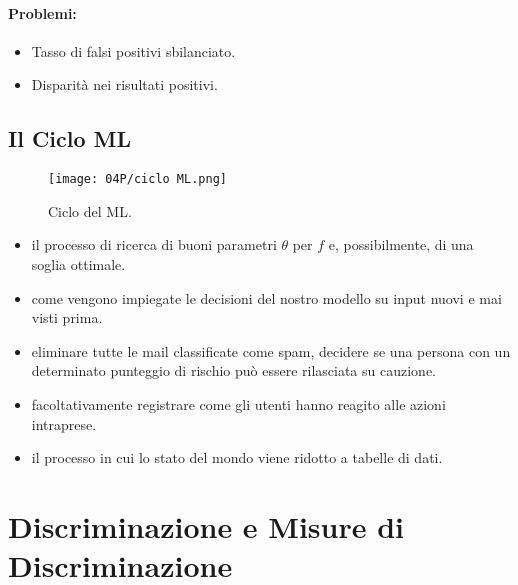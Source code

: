 

\paragraph{Problemi:}

\begin{itemize}
  \item Tasso di falsi positivi sbilanciato. 
  \item Disparità nei risultati positivi.
\end{itemize}

\subsection{Il Ciclo ML}


\begin{figure}[h]
    \centering
    \texttt{[image: 04P/ciclo ML.png]}
    \caption{Ciclo del ML.}
\end{figure}

\begin{itemize}
  \item {} il processo di ricerca di buoni parametri $\theta$ per $f$ e, possibilmente, di una soglia ottimale.
  \item {} come vengono impiegate le decisioni del nostro modello su input nuovi e mai visti prima. 
  \item {} eliminare tutte le mail classificate come spam, decidere se una persona con un determinato punteggio di rischio può essere rilasciata su cauzione.
  \item {} facoltativamente registrare come gli utenti hanno reagito alle azioni intraprese.
  \item {} il processo in cui lo stato del mondo viene ridotto a tabelle di dati.
\end{itemize}

\section{Discriminazione e Misure di Discriminazione}


